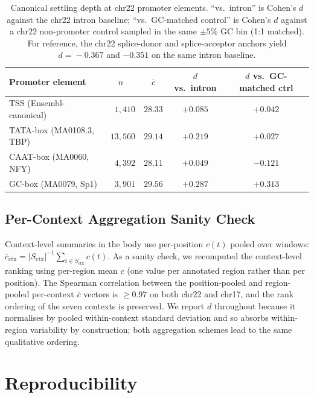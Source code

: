 \documentclass{article}
\theoremstyle{plain}
\theoremstyle{definition}
\theoremstyle{remark}
\begin{document}
\begin{table}[!htbp]
  \caption{Canonical settling depth at chr22 promoter elements. ``vs.\ intron''
    is Cohen's $d$ against the chr22 intron baseline; ``vs.\ GC-matched
    control'' is Cohen's $d$ against a chr22 non-promoter control
    sampled in the same $\pm 5\%$ GC bin (1:1 matched). For reference,
    the chr22 splice-donor and splice-acceptor anchors yield
    $d\!=\!-0.367$ and $-0.351$ on the same intron baseline.}
  \label{tab:promoter-elements}
  \centering
  \small
  \begin{tabular}{@{}lcccc@{}}
    \toprule
    Promoter element & $n$ & $\bar c$ & $d$ vs.\ intron & $d$ vs.\ GC-matched ctrl \\
    \midrule
    TSS (Ensembl-canonical)    & $\phantom{00}{1{,}410}$ & $28.33$ & $+0.085$ & $+0.042$ \\
    TATA-box (MA0108.3, TBP)   & $\phantom{0}{13{,}560}$ & $29.14$ & $+0.219$ & $+0.027$ \\
    CAAT-box (MA0060, NFY)     & $\phantom{00}{4{,}392}$ & $28.11$ & $+0.049$ & $-0.121$ \\
    GC-box (MA0079, Sp1)       & $\phantom{00}{3{,}901}$ & $29.56$ & $+0.287$ & $+0.313$ \\
    \bottomrule
  \end{tabular}
\end{table}

\subsection{Per-Context Aggregation Sanity Check}
\label{app:agg-sanity}

Context-level summaries in the body use per-position $c(t)$ pooled over
windows: $\bar c_{\mathrm{ctx}}\!=\!|S_{\mathrm{ctx}}|^{-1}\sum_{t\in
S_{\mathrm{ctx}}} c(t)$. As a sanity check, we recomputed the
context-level ranking using per-region mean $c$ (one value per
annotated region rather than per position). The Spearman correlation
between the position-pooled and region-pooled per-context $\bar c$
vectors is $\ge 0.97$ on both chr22 and chr17, and the rank ordering
of the seven contexts is preserved. We report $d$ throughout because
it normalises by pooled within-context standard deviation and so
absorbs within-region variability by construction; both aggregation
schemes lead to the same qualitative ordering.

\section{Reproducibility}
\label{app:repro}
\end{document}
